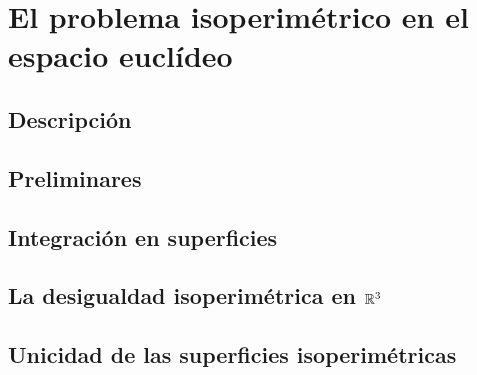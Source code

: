 \documentclass[ oneside,openany,titlepage,numbers=noenddot,headinclude,%
                footinclude=true,cleardoublepage=empty,abstractoff, %
                BCOR=5mm,paper=a4,fontsize=11pt,%
                spanish,american%
                ]{scrreprt}
\begin{document}
\frenchspacing
\raggedbottom
{} %
\pagestyle{plain}
%


\cleardoublepage
\cleardoublepage
\cleardoublepage
\pagestyle{scrheadings}
\cleardoublepage
\cleardoublepage{}
\cleardoublepage

\part{El problema isoperimétrico en el espacio euclídeo}

\chapter{Descripción}




\chapter{Preliminares}


\chapter{Integración en superficies}


\chapter{La desigualdad isoperimétrica en $\mathbb{R}^3$}


\chapter{Unicidad de las superficies isoperimétricas}

\end{document}
